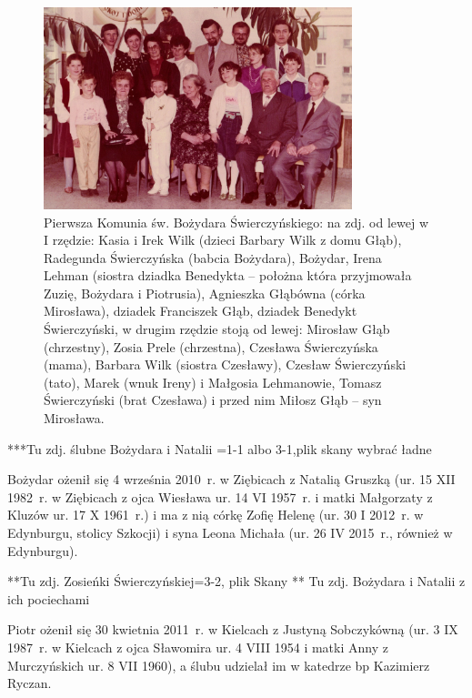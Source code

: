 \begin{figure}[!hb]
\begin{center}
\includegraphics[width=0.8\textwidth]{zdjecia/komunia_bozydara_swierczynskiego_zbiorowe.jpg}
\caption[Pierwsza Komunia św. Bożydara Świerczyńskiego -- zdjęcie zbiorowe]{Pierwsza Komunia św. Bożydara Świerczyńskiego: na zdj. od lewej w I rzędzie: Kasia i Irek Wilk (dzieci Barbary Wilk z domu Głąb), Radegunda Świerczyńska (babcia Bożydara), Bożydar, Irena Lehman (siostra dziadka Benedykta -- położna która przyjmowała Zuzię, Bożydara i Piotrusia), Agnieszka Głąbówna (córka Mirosława), dziadek Franciszek Głąb, dziadek Benedykt Świerczyński, w drugim rzędzie stoją od lewej: Mirosław Głąb (chrzestny), Zosia Prele (chrzestna), Czesława Świerczyńska (mama), Barbara Wilk (siostra Czesławy), Czesław Świerczyński (tato), Marek (wnuk Ireny) i Małgosia Lehmanowie, Tomasz Świerczyński (brat Czesława) i przed nim Miłosz Głąb -- syn Mirosława.}
\label{rys:komunia_bozydara_swierczynskiego_zbiorowe}
\end{center}
\end{figure}

***Tu zdj. ślubne Bożydara i Natalii =1-1 albo 3-1,plik skany
wybrać ładne

Bożydar ożenił się 4 września 2010~r. w Ziębicach z Natalią Gruszką (ur. 15 XII 1982~r. w Ziębicach z ojca Wiesława ur. 14 VI 1957~r. i matki Małgorzaty z Kluzów ur. 17 X 1961~r.) i ma z nią córkę Zofię Helenę (ur. 30 I 2012~r. w Edynburgu, stolicy Szkocji) i syna Leona Michała (ur. 26 IV 2015~r., również w Edynburgu).

**Tu zdj. Zosieńki Świerczyńskiej=3-2, plik Skany
** Tu zdj. Bożydara i Natalii z ich pociechami

Piotr ożenił się 30 kwietnia 2011~r. w Kielcach z Justyną Sobczykówną (ur. 3 IX 1987~r. w Kielcach z ojca Sławomira ur. 4 VIII 1954 i matki Anny z Murczyńskich ur. 8 VII 1960), a ślubu udzielał im w katedrze bp Kazimierz Ryczan.

